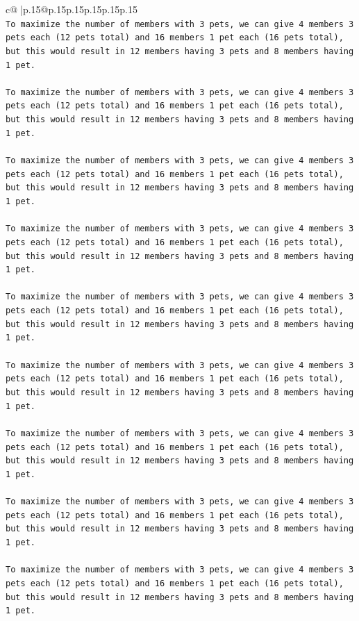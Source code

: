\documentclass{article}
\begin{document}
{\begin{supertabular}{c@{$\;$}|p{.15\linewidth}@{}p{.15\linewidth}p{.15\linewidth}p{.15\linewidth}p{.15\linewidth}p{.15\linewidth}}
{{{\\ 
\texttt{To maximize the number of members with 3 pets, we can give 4 members 3 pets each (12 pets total) and 16 members 1 pet each (16 pets total), but this would result in 12 members having 3 pets and 8 members having 1 pet.} \\
\\ 
\texttt{To maximize the number of members with 3 pets, we can give 4 members 3 pets each (12 pets total) and 16 members 1 pet each (16 pets total), but this would result in 12 members having 3 pets and 8 members having 1 pet.} \\
\\ 
\texttt{To maximize the number of members with 3 pets, we can give 4 members 3 pets each (12 pets total) and 16 members 1 pet each (16 pets total), but this would result in 12 members having 3 pets and 8 members having 1 pet.} \\
\\ 
\texttt{To maximize the number of members with 3 pets, we can give 4 members 3 pets each (12 pets total) and 16 members 1 pet each (16 pets total), but this would result in 12 members having 3 pets and 8 members having 1 pet.} \\
\\ 
\texttt{To maximize the number of members with 3 pets, we can give 4 members 3 pets each (12 pets total) and 16 members 1 pet each (16 pets total), but this would result in 12 members having 3 pets and 8 members having 1 pet.} \\
\\ 
\texttt{To maximize the number of members with 3 pets, we can give 4 members 3 pets each (12 pets total) and 16 members 1 pet each (16 pets total), but this would result in 12 members having 3 pets and 8 members having 1 pet.} \\
\\ 
\texttt{To maximize the number of members with 3 pets, we can give 4 members 3 pets each (12 pets total) and 16 members 1 pet each (16 pets total), but this would result in 12 members having 3 pets and 8 members having 1 pet.} \\
\\ 
\texttt{To maximize the number of members with 3 pets, we can give 4 members 3 pets each (12 pets total) and 16 members 1 pet each (16 pets total), but this would result in 12 members having 3 pets and 8 members having 1 pet.} \\
\\ 
\texttt{To maximize the number of members with 3 pets, we can give 4 members 3 pets each (12 pets total) and 16 members 1 pet each (16 pets total), but this would result in 12 members having 3 pets and 8 members having 1 pet.} \\
}}}
\end{supertabular}}
\end{document}
